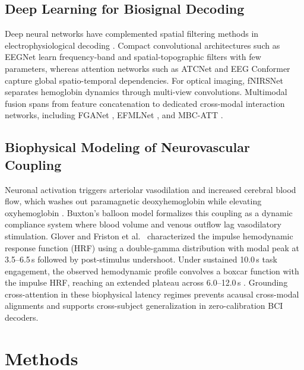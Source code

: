 \documentclass[journal]{IEEEtran}
\begin{document}
\subsection{Deep Learning for Biosignal Decoding}
Deep neural networks have complemented spatial filtering methods in electrophysiological decoding \cite{lotte2018review}. Compact convolutional architectures such as EEGNet \cite{lawhern2018eegnet} learn frequency-band and spatial-topographic filters with few parameters, whereas attention networks such as ATCNet \cite{altaheri2023atcnet} and EEG Conformer \cite{song2022eeg} capture global spatio-temporal dependencies. For optical imaging, fNIRSNet \cite{pandey2024fnirsnet} separates hemoglobin dynamics through multi-view convolutions. Multimodal fusion spans from feature concatenation \cite{chiarelli2018deep} to dedicated cross-modal interaction networks, including FGANet \cite{kwak2022fganet}, EFMLNet \cite{qiu2025efmlnet}, and MBC-ATT \cite{li2024mbcatt}.

\subsection{Biophysical Modeling of Neurovascular Coupling}
Neuronal activation triggers arteriolar vasodilation and increased cerebral blood flow, which washes out paramagnetic deoxyhemoglobin while elevating oxyhemoglobin \cite{attwell2010glial, iadecola2004neurovascular}. Buxton's balloon model \cite{buxton1998dynamics} formalizes this coupling as a dynamic compliance system where blood volume and venous outflow lag vasodilatory stimulation. Glover \cite{glover1999deconvolution} and Friston et al.\ \cite{friston1998event} characterized the impulse hemodynamic response function (HRF) using a double-gamma distribution with modal peak at 3.5--6.5\,s followed by post-stimulus undershoot. Under sustained 10.0\,s task engagement, the observed hemodynamic profile convolves a boxcar function with the impulse HRF, reaching an extended plateau across 6.0--12.0\,s \cite{strangman2002non, scholkmann2014review}. Grounding cross-attention in these biophysical latency regimes prevents acausal cross-modal alignments and supports cross-subject generalization in zero-calibration BCI decoders.

\section{Methods}
\label{sec:methods}
\end{document}
